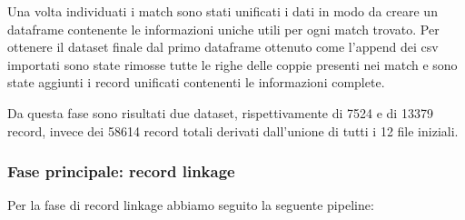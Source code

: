 \documentclass[a4paper,12pt]{article}
\begin{document}
Una volta individuati i match sono stati unificati i dati in modo da creare un dataframe contenente le informazioni uniche utili per ogni match trovato. Per ottenere il dataset finale dal primo dataframe ottenuto come l'append dei csv importati sono state rimosse tutte le righe delle coppie presenti nei match e sono state aggiunti i record unificati contenenti le informazioni complete.

Da questa fase sono risultati due dataset, rispettivamente di 7524 e di 13379 record, invece dei 58614 %
record totali derivati dall'unione di tutti i 12 file iniziali.

\subsubsection{Fase principale: record linkage}
Per la fase di record linkage abbiamo seguito la seguente pipeline: 
\end{document}
